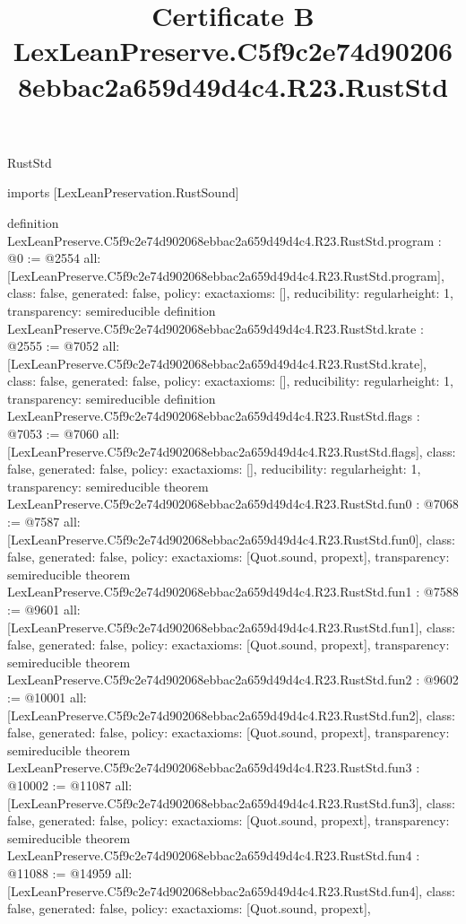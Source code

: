 \begin{lexlean}{RustStd}
\title{Certificate B LexLeanPreserve.C5f9c2e74d902068ebbac2a659d49d4c4.R23.RustStd}
\begin{coremodule}
imports [LexLeanPreservation.RustSound]

definition LexLeanPreserve.C5f9c2e74d902068ebbac2a659d49d4c4.R23.RustStd.program : @0 := @2554 {
  all: [LexLeanPreserve.C5f9c2e74d902068ebbac2a659d49d4c4.R23.RustStd.program],
  class: false,
  generated: false,
  policy: exact{axioms: []},
  reducibility: regular{height: 1},
  transparency: semireducible
}
definition LexLeanPreserve.C5f9c2e74d902068ebbac2a659d49d4c4.R23.RustStd.krate : @2555 := @7052 {
  all: [LexLeanPreserve.C5f9c2e74d902068ebbac2a659d49d4c4.R23.RustStd.krate],
  class: false,
  generated: false,
  policy: exact{axioms: []},
  reducibility: regular{height: 1},
  transparency: semireducible
}
definition LexLeanPreserve.C5f9c2e74d902068ebbac2a659d49d4c4.R23.RustStd.flags : @7053 := @7060 {
  all: [LexLeanPreserve.C5f9c2e74d902068ebbac2a659d49d4c4.R23.RustStd.flags],
  class: false,
  generated: false,
  policy: exact{axioms: []},
  reducibility: regular{height: 1},
  transparency: semireducible
}
theorem LexLeanPreserve.C5f9c2e74d902068ebbac2a659d49d4c4.R23.RustStd.fun0 : @7068 := @7587 {
  all: [LexLeanPreserve.C5f9c2e74d902068ebbac2a659d49d4c4.R23.RustStd.fun0],
  class: false,
  generated: false,
  policy: exact{axioms: [Quot.sound, propext]},
  transparency: semireducible
}
theorem LexLeanPreserve.C5f9c2e74d902068ebbac2a659d49d4c4.R23.RustStd.fun1 : @7588 := @9601 {
  all: [LexLeanPreserve.C5f9c2e74d902068ebbac2a659d49d4c4.R23.RustStd.fun1],
  class: false,
  generated: false,
  policy: exact{axioms: [Quot.sound, propext]},
  transparency: semireducible
}
theorem LexLeanPreserve.C5f9c2e74d902068ebbac2a659d49d4c4.R23.RustStd.fun2 : @9602 := @10001 {
  all: [LexLeanPreserve.C5f9c2e74d902068ebbac2a659d49d4c4.R23.RustStd.fun2],
  class: false,
  generated: false,
  policy: exact{axioms: [Quot.sound, propext]},
  transparency: semireducible
}
theorem LexLeanPreserve.C5f9c2e74d902068ebbac2a659d49d4c4.R23.RustStd.fun3 : @10002 := @11087 {
  all: [LexLeanPreserve.C5f9c2e74d902068ebbac2a659d49d4c4.R23.RustStd.fun3],
  class: false,
  generated: false,
  policy: exact{axioms: [Quot.sound, propext]},
  transparency: semireducible
}
theorem LexLeanPreserve.C5f9c2e74d902068ebbac2a659d49d4c4.R23.RustStd.fun4 : @11088 := @14959 {
  all: [LexLeanPreserve.C5f9c2e74d902068ebbac2a659d49d4c4.R23.RustStd.fun4],
  class: false,
  generated: false,
  policy: exact{axioms: [Quot.sound, propext]},
}
\end{coremodule}
\end{lexlean}

